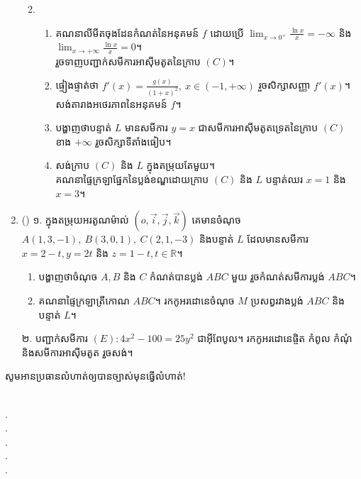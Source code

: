 \documentclass{officialexam}
\begin{document}
\begin{enumerate}[I]
\begin{enumerate}[m]
\begin{enumerate}[k]
		\end{enumerate}
		\item\begin{enumerate}[k]
			\item គណនាលីមីតចុងដែនកំណត់នៃអនុគមន៍ $f$ ដោយប្រើ $\lim_{x\to0^{+}}\frac{\ln x}{x}=-\infty$ និង $\lim_{x\to+\infty}\frac{\ln x}{x}=0$។\\ រួចទាញបញ្ជាក់សមីការអាសុីមតូតនៃក្រាប $\left(C\right)$។
			\item ផ្ទៀងផ្ទាត់ថា $f'(x)=\frac{g(x)}{\left(1+x\right)^2},~x\in\left(-1,+\infty\right)$ រួចសិក្សាសញ្ញា $f'(x)$។ សង់តារាងអថេរភាពនៃអនុគមន៍ $f$។
			\item បង្ហាញថាបន្ទាត់ $L$ មានសមីការ $y=x$ ជាសមីការអាសុីមតូតទ្រេតនៃក្រាប $\left(C\right)$ ខាង $+\infty$ រួចសិក្សាទីតាំងធៀប។ 
			\item សង់ក្រាប $\left(C\right)$ និង $L$ ក្នុងតម្រុយតែមួយ។ \\គណនាផ្ទៃក្រឡាផ្នែកនៃប្លង់ខណ្ឌដោយក្រាប $\left(C\right)$ និង $L$ បន្ទាត់ឈរ $x=1$ និង $x=3$។
		\end{enumerate}
	\end{enumerate}
	\item {\color{khtug}()} {\color{khtug}១.} ក្នុងតម្រុយអរតូណម៉ាល់ $\left(o,\vec{i},\vec{j},\vec{k}\right)$ គេមានចំណុច $A\left(1,3,-1\right),~B\left(3,0,1\right),~C\left(2,1,-3\right)$ និងបន្ទាត់ $L$ ដែលមានសមីការ $x=2-t,y=2t$ និង $z=1-t,t\in \mathbb{R}$។
	\begin{enumerate}[k]
		\item បង្ហាញថាចំណុច $A,B$ និង $C$ កំណត់បានប្លង់ $ABC$ មួយ រួចកំណត់សមីការប្លង់ $ABC$។
		\item គណនាផ្ទៃក្រឡាត្រីកោណ $ABC$។ រកកូអរដោនេចំណុច $M$ ប្រសព្វរវាងប្លង់ $ABC$ និងបន្ទាត់ $L$។
	\end{enumerate}
	{\color{khtug}២.} បញ្ជាក់សមីការ $\left(E\right): 4x^2-100=25y^2$ ជាអុីពែបូល។ រកកូអរដោនេផ្ចិត កំពូល កំណុំ និងសមីការអាសុីមតូត រួចសង់។
\end{enumerate}
\begin{center}
	\sffamily\color{blue}
	សូមអានប្រធានលំហាត់ឲ្យបានច្បាស់មុនធ្វើលំហាត់!
\end{center}\newpage
{}\\
{\color{white}.}\dotfill\\
{\color{white}.}\dotfill\\
{\color{white}.}\dotfill
\\
{\color{white}.}\dotfill\\
{\color{white}.}\dotfill\\
\end{document}
